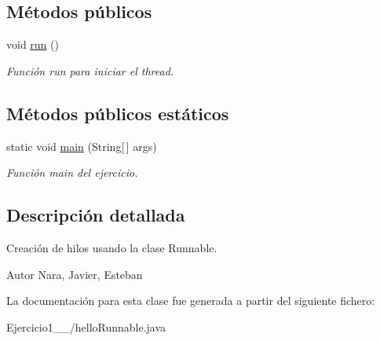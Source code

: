 \subsection*{Métodos públicos}
\begin{DoxyCompactItemize}
\item 
\hypertarget{class_ejercicio1__1__2_1_1hello_runnable_a27a035138d87853e1cc0d8e30c6d3dd2}{}void \hyperlink{class_ejercicio1__1__2_1_1hello_runnable_a27a035138d87853e1cc0d8e30c6d3dd2}{run} ()\label{class_ejercicio1__1__2_1_1hello_runnable_a27a035138d87853e1cc0d8e30c6d3dd2}

\begin{DoxyCompactList}\small\item\em Función run para iniciar el thread. \end{DoxyCompactList}\end{DoxyCompactItemize}
\subsection*{Métodos públicos estáticos}
\begin{DoxyCompactItemize}
\item 
\hypertarget{class_ejercicio1__1__2_1_1hello_runnable_a7e90a3111107454bc7051d2d081fb494}{}static void \hyperlink{class_ejercicio1__1__2_1_1hello_runnable_a7e90a3111107454bc7051d2d081fb494}{main} (String\mbox{[}$\,$\mbox{]} args)\label{class_ejercicio1__1__2_1_1hello_runnable_a7e90a3111107454bc7051d2d081fb494}

\begin{DoxyCompactList}\small\item\em Función main del ejercicio. \end{DoxyCompactList}\end{DoxyCompactItemize}


\subsection{Descripción detallada}
Creación de hilos usando la clase Runnable. 

\begin{DoxyAuthor}{Autor}
Nara, Javier, Esteban 
\end{DoxyAuthor}


La documentación para esta clase fue generada a partir del siguiente fichero\+:\begin{DoxyCompactItemize}
\item 
Ejercicio1\+\_\+\_/hello\+Runnable.\+java\end{DoxyCompactItemize}
